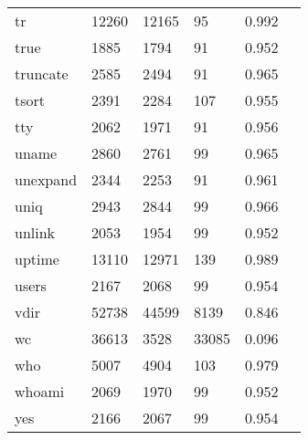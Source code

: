 \begin{longtable}{lp{2.40cm}p{2.40cm}p{2.40cm}p{2.40cm}p{2.40cm}}
tr        &                    12260 &        12165 &            95 &                    0.992 \\
true      &                     1885 &         1794 &            91 &                    0.952 \\
truncate  &                     2585 &         2494 &            91 &                    0.965 \\
tsort     &                     2391 &         2284 &           107 &                    0.955 \\
tty       &                     2062 &         1971 &            91 &                    0.956 \\
uname     &                     2860 &         2761 &            99 &                    0.965 \\
unexpand  &                     2344 &         2253 &            91 &                    0.961 \\
uniq      &                     2943 &         2844 &            99 &                    0.966 \\
unlink    &                     2053 &         1954 &            99 &                    0.952 \\
uptime    &                    13110 &        12971 &           139 &                    0.989 \\
users     &                     2167 &         2068 &            99 &                    0.954 \\
vdir      &                    52738 &        44599 &          8139 &                    0.846 \\
wc        &                    36613 &         3528 &         33085 &                    0.096 \\
who       &                     5007 &         4904 &           103 &                    0.979 \\
whoami    &                     2069 &         1970 &            99 &                    0.952 \\
yes       &                     2166 &         2067 &            99 &                    0.954 \\
\end{longtable}
